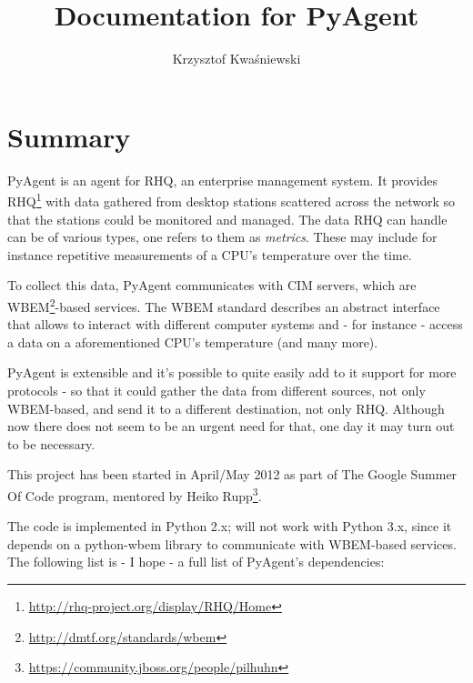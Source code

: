 \documentclass[a4paper,twoside,11pt]{article}
\author{Krzysztof Kwaśniewski}
\title{\LARGE Documentation for PyAgent}
\begin{document}
	\maketitle

	\tableofcontents
	\newpage

	\section{Summary}
		PyAgent is an agent for RHQ, an enterprise management system. It provides RHQ\footnote{\href{http://rhq-project.org/display/RHQ/Home}{http://rhq-project.org/display/RHQ/Home}} with data gathered from desktop stations scattered across the network so that the stations could be monitored and managed. The data RHQ can handle can be of various types, one refers to them as \emph{metrics}. These may include for instance repetitive measurements of a CPU's temperature over the time.

		To collect this data, PyAgent communicates with CIM servers, which are WBEM\footnote{\href{http://dmtf.org/standards/wbem}{http://dmtf.org/standards/wbem}}-based services. The WBEM standard describes an abstract interface that allows to interact with different computer systems and - for instance - access a data on a aforementioned CPU's temperature (and many more).

		PyAgent is extensible and it's possible to quite easily add to it support for more protocols - so that it could gather the data from different sources, not only WBEM-based, and send it to a different destination, not only RHQ. Although now there does not seem to be an urgent need for that, one day it may turn out to be necessary.

		This project has been started in April/May 2012 as part of The Google Summer Of Code program, mentored by Heiko Rupp\footnote{\href{https://community.jboss.org/people/pilhuhn}{https://community.jboss.org/people/pilhuhn}}.
		
		The code is implemented in Python 2.x; will not work with Python 3.x, since it depends on a python-wbem library to communicate with WBEM-based services. The following list is - I hope - a full list of PyAgent's dependencies:
\end{document}

